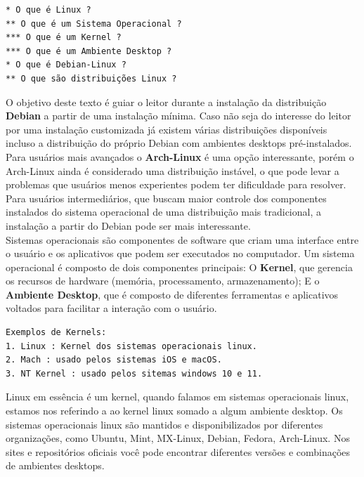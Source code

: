 \documentclass[12pt,a4paper]{article}
\begin{document}
\begin{lstlisting}
* O que é Linux ?
** O que é um Sistema Operacional ? 
*** O que é um Kernel ?
*** O que é um Ambiente Desktop ?
* O que é Debian-Linux ?
** O que são distribuições Linux ? 
\end{lstlisting}

\vspace{\baselineskip}

O objetivo deste texto é guiar o leitor durante a instalação da distribuição \textbf{Debian} a partir de uma instalação mínima. Caso não seja do interesse do leitor por uma instalação customizada já existem várias distribuições disponíveis incluso a distribuição do próprio Debian com ambientes desktops pré-instalados. \\

Para usuários mais avançados o \textbf{Arch-Linux} é uma opção interessante, porém o Arch-Linux ainda é considerado uma distribuição instável, o que pode levar a problemas que usuários menos experientes podem ter dificuldade para resolver. Para usuários intermediários, que buscam maior controle dos componentes instalados do sistema operacional de uma distribuição mais tradicional, a instalação a partir do Debian pode ser mais interessante. \\

Sistemas operacionais são componentes de software que criam uma interface entre o usuário e os aplicativos que podem ser executados no computador. Um sistema operacional é composto de dois componentes principais: O \textbf{Kernel}, que gerencia os recursos de hardware (memória, processamento, armazenamento); E o \textbf{Ambiente Desktop}, que é composto de diferentes ferramentas e aplicativos voltados para facilitar a interação com o usuário.\\

\begin{lstlisting}
Exemplos de Kernels:
1. Linux : Kernel dos sistemas operacionais linux. 
2. Mach : usado pelos sistemas iOS e macOS.
3. NT Kernel : usado pelos sitemas windows 10 e 11.
\end{lstlisting}

\vspace{\baselineskip}

Linux em essência é um kernel, quando falamos em sistemas operacionais linux, estamos nos referindo a ao kernel linux somado a algum ambiente desktop. Os sistemas operacionais linux são mantidos e disponibilizados por diferentes organizações, como Ubuntu, Mint, MX-Linux, Debian, Fedora, Arch-Linux. Nos sites e repositórios oficiais você pode encontrar diferentes versões e combinações de ambientes desktops. \\ 
\end{document}
